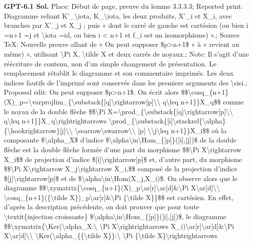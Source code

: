 \textbf{GPT-6.1 Sol.} Place: Début de page, preuve du lemme 3.3.3.3; Reported print: Diagramme reliant K'\_\textbackslash{}iota, K\_\textbackslash{}iota, les deux produits, X'\_i et X\_i, avec branches par X'\_j et X\_j ; puis « dont le carré de gauche est cartésien (ou bien i =\allowbreak  n+1 =\allowbreak  j et \textbackslash{}iota =\allowbreak  id, ou bien i < n+1 et f\_i est un isomorphisme) ».; Source TeX: Nouvelle preuve allant de « On peut supposer \$p>n+1\$ » à « revient au même) », utilisant \textbackslash{}Pi X, \textbackslash{}tilde X et deux carrés de noyaux.; Note: Il s'agit d'une réécriture de contenu, non d'un simple changement de présentation. Le remplacement rétablit le diagramme et son commentaire imprimés. Les deux indices fautifs de l'imprimé sont conservés dans les premiers arguments des \textbackslash{}sisi.; Proposed edit: On peut supposer \$p>n+1\$. On écrit alors \$\$\textbackslash{}cosq\_\{n+1\}(X)\_p=\allowbreak \textbackslash{}varprojlim\_\{\textbackslash{}substack\{[q]\textbackslash{}rightarrow[p]\textbackslash{}\textbackslash{} q\textbackslash{}leq n+1\}\}X\_q\$\$ comme le noyau de la double flèche  \$\$\textbackslash{}Pi X=\allowbreak \textbackslash{}prod\_\{\textbackslash{}substack\{[q]\textbackslash{}rightarrow[p]\textbackslash{}\textbackslash{} q\textbackslash{}leq n+1\}\}X\_q\textbackslash{}rightrightarrows \textbackslash{}prod\_\{\textbackslash{}substack\{[i]\textbackslash{}stackrel\{\textbackslash{}alpha\}\{\textbackslash{}hookrightarrow\}[j]\textbackslash{}\textbackslash{} \textbackslash{}searrow\textbackslash{}swarrow\textbackslash{}\textbackslash{} [p] \textbackslash{}\textbackslash{}j\textbackslash{}leq n+1\}\}X\_i\$\$ où la composante \$\textbackslash{}alpha\_X\$ d'indice \$\textbackslash{}alpha\textbackslash{}in\textbackslash{}Hom\_\{[p]\}([i],[j])\$ de la double flèche est la double flèche formée d'une part du morphisme \$\$\textbackslash{}Pi X\textbackslash{}rightarrow X\_i\$\$ de projection d'indice \$[i]\textbackslash{}rightarrow[p]\$ et, d'autre part, du morphisme \$\$\textbackslash{}Pi X\textbackslash{}rightarrow X\_j\textbackslash{}rightarrow X\_i,\$\$ composé de la projection d'indice \$[j]\textbackslash{}rightarrow[p]\$ et de \$\textbackslash{}alpha\textbackslash{}in\textbackslash{}Hom(X\_j,X\_i)\$.  On observe alors que le diagramme \$\$\textbackslash{}xymatrix\{\textbackslash{}cosq\_\{n+1\}(X)\_p\textbackslash{}ar[r]\textbackslash{}ar[d]\&\textbackslash{}Pi X\textbackslash{}ar[d]\textbackslash{}\textbackslash{} \textbackslash{}cosq\_\{n+1\}(\{\textbackslash{}tilde X\})\_p\textbackslash{}ar[r]\&\textbackslash{}Pi \{\textbackslash{}tilde X\}\}\$\$ est cartésien.  En effet, d'après la description précédente, on doit prouver que pour toute \textbackslash{}textit\{injection croissante\} \$\textbackslash{}alpha\textbackslash{}in\textbackslash{}Hom\_\{[p]\}([i],[j])\$, le diagramme \$\$\textbackslash{}xymatrix\{\textbackslash{}Ker(\textbackslash{}alpha\_X:\textbackslash{} \textbackslash{}Pi X\textbackslash{}rightrightarrows X\_i)\textbackslash{}ar[r]\textbackslash{}ar[d]\&\textbackslash{}Pi X\textbackslash{}ar[d]\textbackslash{}\textbackslash{} \textbackslash{}Ker(\textbackslash{}alpha\_\{\{\textbackslash{}tilde X\}\}:\textbackslash{} \textbackslash{}Pi \{\textbackslash{}tilde X\}\textbackslash{}rightrightarrows 